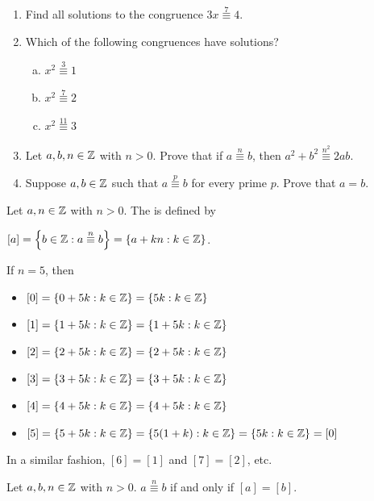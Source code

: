 \documentclass[11pt,fleqn,dvipsnames,usenames]{article}
\newcommand{\p}{\noindent}
\begin{document}
\begin{exercises} \phantom{ }
\begin{enumerate}[(1)]
\item Find all solutions to the congruence $3x\overset{7}{\equiv} 4$.
\item Which of the following congruences have solutions?
\begin{enumerate}[(a)]
\item $x^{2}\overset{3}{\equiv} 1$
\item $x^{2}\overset{7}{\equiv} 2$
\item $x^{2}\overset{11}{\equiv} 3$
\end{enumerate}
\item Let $a,b,n\in\mathbb{Z}$ with $n > 0$.  Prove that if $a\overset{n}{\equiv}b$, then $a^2 + b^2\overset{n^2}{\equiv}2ab$.
\item Suppose $a,b\in\mathbb{Z}$ such that $a\overset{p}{\equiv}b$ for every prime $p$.  Prove that $a = b$.
\end{enumerate}
\end{exercises}
%
\begin{definition}\label{congruenceclassmodndefn}
Let $a,n\in\mathbb{Z}$ with $n > 0$.  The  is defined by
\begin{center}
$[a] = \left\{b\in\mathbb{Z} : a\overset{n}{\equiv}b\right\} = \left\{a + kn:k\in\mathbb{Z}\right\}$.
\end{center}
\end{definition}
%
\begin{example}
If $n = 5$, then
\begin{itemize}[\ ]
\item $[0] = \left\{0 + 5k:k\in\mathbb{Z}\right\} = \left\{5k:k\in\mathbb{Z}\right\}$
\item $[1] = \left\{1 + 5k:k\in\mathbb{Z}\right\} = \left\{1 + 5k:k\in\mathbb{Z}\right\}$
\item $[2] = \left\{2 + 5k:k\in\mathbb{Z}\right\} = \left\{2 + 5k:k\in\mathbb{Z}\right\}$
\item $[3] = \left\{3 + 5k:k\in\mathbb{Z}\right\} = \left\{3 + 5k:k\in\mathbb{Z}\right\}$
\item $[4] = \left\{4 + 5k:k\in\mathbb{Z}\right\} = \left\{4 + 5k:k\in\mathbb{Z}\right\}$
\item $[5] = \left\{5 + 5k:k\in\mathbb{Z}\right\} = \left\{5(1 + k):k\in\mathbb{Z}\right\} = \left\{5k:k\in\mathbb{Z}\right\} = [0]$
\end{itemize}
\p In a similar fashion, $[6] = [1]$ and $[7] = [2]$, etc.
\end{example}
%
\begin{theorem}\label{congruenceequalitycriterion}
Let $a,b,n\in\mathbb{Z}$ with $n > 0$.  $a\overset{n}{\equiv}b$ if and only if $[a] = [b]$.
\end{theorem}
\end{document}
